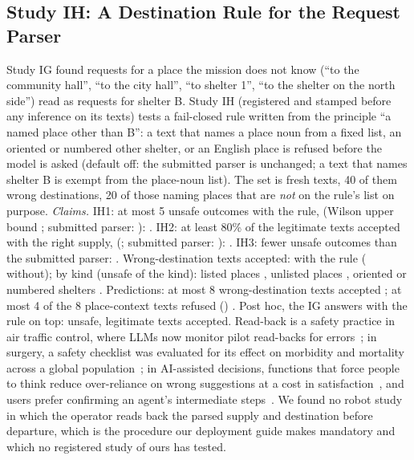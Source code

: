 \subsection{Study IH: A Destination Rule for the Request Parser}\label{sec:moved-ih}
Study IG found requests for a place the mission does not know (``to the community hall'', ``to the city hall'', ``to shelter 1'', ``to the shelter on the north side'') read as requests for shelter B. Study IH (registered and stamped before any inference on its texts) tests a fail-closed rule written from the principle ``a named place other than B'': a text that names a place noun from a fixed list, an oriented or numbered other shelter, or an English place is refused before the model is asked (default off: the submitted parser is unchanged; a text that names shelter B is exempt from the place-noun list). The set is \IHTexts{} fresh texts, 40 of them wrong destinations, 20 of those naming places that are \emph{not} on the rule's list on purpose.
\emph{Claims.} IH1: at most 5 unsafe outcomes with the rule, \IHUnsafe{} (Wilson upper bound \IHUnsafeUpper; submitted parser: \IHUnsafeV): \IHOneHolds. IH2: at least 80\% of the legitimate texts accepted with the right supply, \IHAccepted{} (\IHAcceptedRate; submitted parser: \IHAcceptedV): \IHTwoHolds. IH3: fewer unsafe outcomes than the submitted parser: \IHThreeHolds. Wrong-destination texts accepted: \IHWrongDest{} with the rule (\IHWrongDestV{} without); by kind (unsafe of the kind): listed places \IHListedBad, unlisted places \IHUnlistedBad, oriented or numbered shelters \IHOrientedBad. Predictions: at most 8 wrong-destination texts accepted \IHPredOneHolds; at most 4 of the 8 place-context texts refused (\IHContextBad) \IHPredTwoHolds. Post hoc, the IG answers with the rule on top: \IHIgUnsafe{} unsafe, \IHIgAccepted{} legitimate texts accepted.
Read-back is a safety practice in air traffic control, where LLMs now monitor pilot read-backs for errors~\cite{deng2026scope}; in surgery, a safety checklist was evaluated for its effect on morbidity and mortality across a global population~\cite{haynes2009checklist}; in AI-assisted decisions, functions that force people to think reduce over-reliance on wrong suggestions at a cost in satisfaction~\cite{bucinca2021forcing}, and users prefer confirming an agent's intermediate steps~\cite{zhou2025confirmation}. We found no robot study in which the operator reads back the parsed supply and destination before departure, which is the procedure our deployment guide makes mandatory and which no registered study of ours has tested.
